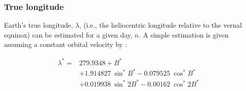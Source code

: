 \subsubsection{True longitude}
\label{sec:lambda}
Earth's true longitude, $\lambda$, (i.e., the heliocentric longitude relative to the vernal equinox) can be estimated for a given day, $n$. 
A simple estimation is given assuming a constant orbital velocity by \parencite{woolf68}:

\begin{equation}
\label{eq:woolf}
	\begin{split}
    	\lambda^{\ast} = & 279.9348 + B^{\ast} \\
    	          & + 1.914827 \: \sin^{\ast} B^{\ast} 
    	            - 0.079525 \: \cos^{\ast} B^{\ast} \\
    	          & + 0.019938 \: \sin^{\ast} 2B^{\ast} 
    	            - 0.00162 \: \cos^{\ast} 2B^{\ast}
    \end{split}
\end{equation} 

